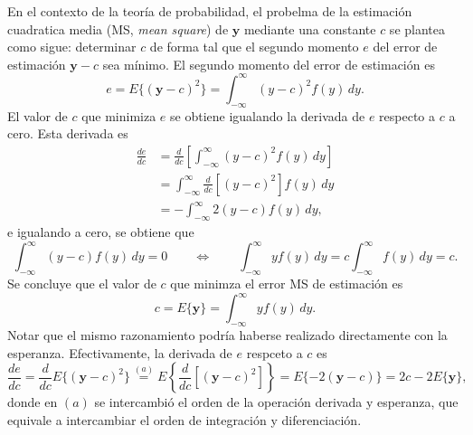 \documentclass[a4paper]{report}
\newcommand{\y}{\mathbf{y}}
\begin{document}
En el contexto de la teoría de probabilidad, el probelma de la estimación cuadratica media (MS, \emph{mean square}) de \(\y\) mediante una constante \(c\) se plantea como sigue: determinar \(c\) de forma tal que el segundo momento \(e\) del error de estimación \(\y-c\) sea mínimo. El segundo momento del error de estimación es
\begin{equation}\label{eq:mse_constant_definition}
 e=E\{(\y-c)^2\}=\int_{-\infty}^{\infty}(y-c)^2f(y)\,dy.
\end{equation}
El valor de \(c\) que minimiza \(e\) se obtiene igualando la derivada de \(e\) respecto a \(c\) a cero. Esta derivada es
\begin{align*}
 \frac{de}{dc}&=\frac{d}{dc}\left[\int_{-\infty}^{\infty}(y-c)^2f(y)\,dy\right]\\
  &=\int_{-\infty}^{\infty}\frac{d}{dc}\left[(y-c)^2\right]f(y)\,dy\\
  &=-\int_{-\infty}^{\infty}2(y-c)f(y)\,dy,
\end{align*}
e igualando a cero, se obtiene que
\[
 \int_{-\infty}^{\infty}(y-c)f(y)\,dy=0\qquad\Leftrightarrow\qquad \int_{-\infty}^{\infty}yf(y)\,dy=c\int_{-\infty}^{\infty}f(y)\,dy=c.
\]
Se concluye que el valor de \(c\) que minimza el error MS de estimación es
\begin{equation}\label{eq:mse_constant}
 c=E\{\y\}=\int_{-\infty}^{\infty}yf(y)\,dy.
\end{equation}
Notar que el mismo razonamiento podría haberse realizado directamente con la esperanza. Efectivamente, la derivada de \(e\) respceto a \(c\) es
\[
 \frac{de}{dc}=\frac{d}{dc}E\{(\y-c)^2\}\overset{(a)}{=}E\left\{\frac{d}{dc}\left[(\y-c)^2\right]\right\}
 =E\{-2(\y-c)\}=2c-2E\{\y\},
\]
donde en \((a)\) se intercambió el orden de la operación derivada y esperanza, que equivale a intercambiar el orden de integración y diferenciación. 
\end{document}
